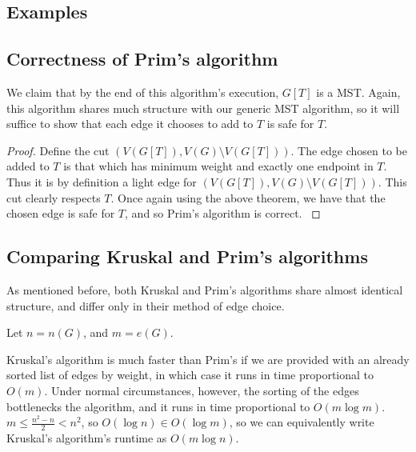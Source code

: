 \documentclass[11pt]{article}
\begin{document}
\subsection{Examples}

\begin{figure}[H]

\end{figure}
\begin{figure}[H]

\end{figure}
\begin{figure}[H]

\end{figure}


\subsection{Correctness of Prim's algorithm}

We claim that by the end of this algorithm's execution, $G[T]$ is a MST.
Again, this algorithm shares much structure with our generic MST algorithm, so it will suffice to show that each edge it chooses to add to $T$ is safe for $T$.
\begin{proof}
	Define the cut $(V(G[T]), V(G)\setminus V(G[T]))$.
	The edge chosen to be added to $T$ is that which has minimum weight and exactly one endpoint in $T$.
	Thus it is by definition a light edge for $(V(G[T]), V(G)\setminus V(G[T]))$.
	This cut clearly respects $T$.
	Once again using the above theorem, we have that the chosen edge is safe for $T$, and so Prim's algorithm is correct. \cite{CLRS}
\end{proof}


\subsection{Comparing Kruskal and Prim's algorithms}

As mentioned before, both Kruskal and Prim's algorithms share almost identical structure, and differ only in their method of edge choice.

Let $n=n(G)$, and $m=e(G)$.

Kruskal's algorithm is much faster than Prim's if we are provided with an already sorted list of edges by weight, in which case it runs in time proportional to $O(m)$.
Under normal circumstances, however, the sorting of the edges bottlenecks the algorithm, and it runs in time proportional to $O(m\log m)$.
$m\le\frac{n^2-n}{2}<n^2$, so $O(\log n)\in O(\log m)$, so we can equivalently write Kruskal's algorithm's runtime as $O(m\log n)$. \cite{CLRS}
\end{document}
